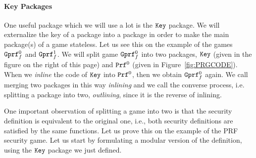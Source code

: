 \documentclass[a4paper,table,dvipsnames]{article}
\theoremstyle{definition}
\newcommand{\M}[1]{\ensuremath{\text{\texttt{#1}}}}
\begin{document}
\paragraph{Key Packages}
One useful package which we will use a lot is the $\M{Key}$ package. We will externalize the key of a package into
a package in order to make the main package(s) of a game stateless. Let us see this on the example of the games $\M{Gprf}_f^0$
and $\M{Gprf}_f^1$. We will split game $\M{Gprf}_f^0$ into two packages, $\M{Key}$ (given in the figure on the right
of this page) and $\M{Prf}^0$ (given in Figure~\ref{fig:PRGCODE}). When we \emph{inline} the code of $\M{Key}$ into
$\M{Prf}^0$, then we obtain $\M{Gprf}_f^0$ again. We call merging two packages in this way \emph{inlining} and we
call the converse process, i.e. splitting a package into two, \emph{outlining}, since it is the reverse of inlining.

One important observation of splitting a game into two is that the security definition is equivalent to the original one, i.e., both security definitions are satisfied by the same functions. Let us prove this on the example of the PRF security game.
Let us start by formulating a modular version of the definition, using the $\M{Key}$ package we just defined.
\end{document}
